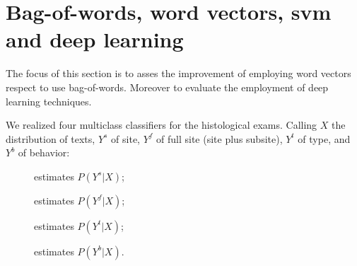 \section{Bag-of-words, word vectors, \ac{svm} and deep learning}
\label{ch:icdoFirst}
The focus of this section is to asses the improvement of employing
word vectors respect to use bag-of-words. Moreover to evaluate the
employment of deep learning techniques.

We realized four multiclass classifiers for the
histological exams. Calling $X$ the distribution of texts, $Y^s$
of site, $Y^f$ of full site (site plus subsite), $Y^t$ of type, and
$Y^b$ of behavior:
\begin{description}
  \item[\site{}] estimates $P(Y^s|X)$;
  \item[\fullSite{}] estimates $P(Y^f|X)$;
  \item[\type{}] estimates $P(Y^t|X)$;
  \item[\behaviour{}] estimates $P(Y^b|X)$.
\end{description}



